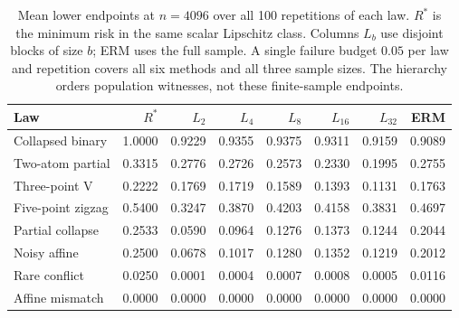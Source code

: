 \begin{table}[t]
\centering\small
\caption{Mean lower endpoints at $n=4096$ over all 100 repetitions of each law. $R^*$ is the minimum risk in the same scalar Lipschitz class. Columns $L_b$ use disjoint blocks of size $b$; ERM uses the full sample. A single failure budget $0.05$ per law and repetition covers all six methods and all three sample sizes. The hierarchy orders population witnesses, not these finite-sample endpoints.}
\label{tab:block-hierarchy}
\begin{tabular}{lrrrrrrr}
\toprule
Law & $R^*$ & $L_2$ & $L_4$ & $L_8$ & $L_{16}$ & $L_{32}$ & ERM \\
\midrule
Collapsed binary & 1.0000 & 0.9229 & 0.9355 & 0.9375 & 0.9311 & 0.9159 & 0.9089 \\
Two-atom partial & 0.3315 & 0.2776 & 0.2726 & 0.2573 & 0.2330 & 0.1995 & 0.2755 \\
Three-point V & 0.2222 & 0.1769 & 0.1719 & 0.1589 & 0.1393 & 0.1131 & 0.1763 \\
Five-point zigzag & 0.5400 & 0.3247 & 0.3870 & 0.4203 & 0.4158 & 0.3831 & 0.4697 \\
Partial collapse & 0.2533 & 0.0590 & 0.0964 & 0.1276 & 0.1373 & 0.1244 & 0.2044 \\
Noisy affine & 0.2500 & 0.0678 & 0.1017 & 0.1280 & 0.1352 & 0.1219 & 0.2012 \\
Rare conflict & 0.0250 & 0.0001 & 0.0004 & 0.0007 & 0.0008 & 0.0005 & 0.0116 \\
Affine mismatch & 0.0000 & 0.0000 & 0.0000 & 0.0000 & 0.0000 & 0.0000 & 0.0000 \\
\bottomrule
\end{tabular}
\end{table}
